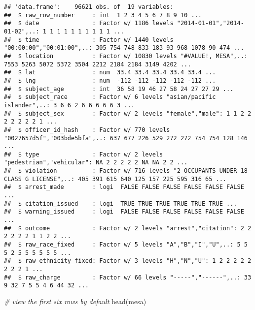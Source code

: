 \documentclass[
]{article}
\newenvironment{Shaded}{\begin{snugshade}}{\end{snugshade}}
\newcommand{\CommentTok}[1]{\textcolor[rgb]{0.56,0.35,0.01}{\textit{#1}}}
\newcommand{\FunctionTok}[1]{\textcolor[rgb]{0.00,0.00,0.00}{#1}}
\newcommand{\NormalTok}[1]{#1}
\begin{document}
\begin{verbatim}
## 'data.frame':    96621 obs. of  19 variables:
##  $ raw_row_number     : int  1 2 3 4 5 6 7 8 9 10 ...
##  $ date               : Factor w/ 1186 levels "2014-01-01","2014-01-02",..: 1 1 1 1 1 1 1 1 1 1 ...
##  $ time               : Factor w/ 1440 levels "00:00:00","00:01:00",..: 305 754 748 833 183 93 968 1078 90 474 ...
##  $ location           : Factor w/ 10830 levels "#VALUE!, MESA",..: 7553 5263 5072 5372 3504 2212 2184 2184 3149 4202 ...
##  $ lat                : num  33.4 33.4 33.4 33.4 33.4 ...
##  $ lng                : num  -112 -112 -112 -112 -112 ...
##  $ subject_age        : int  36 58 19 46 27 58 24 27 27 29 ...
##  $ subject_race       : Factor w/ 6 levels "asian/pacific islander",..: 3 6 6 2 6 6 6 6 6 3 ...
##  $ subject_sex        : Factor w/ 2 levels "female","male": 1 1 2 2 2 2 2 2 2 1 ...
##  $ officer_id_hash    : Factor w/ 770 levels "0027657d5f","003bde5bfa",..: 637 677 226 529 272 272 754 754 128 146 ...
##  $ type               : Factor w/ 2 levels "pedestrian","vehicular": NA 2 2 2 2 2 NA NA 2 2 ...
##  $ violation          : Factor w/ 716 levels "2 OCCUPANTS UNDER 18 CLASS G LICENSE",..: 405 391 615 640 125 157 225 595 316 65 ...
##  $ arrest_made        : logi  FALSE FALSE FALSE FALSE FALSE FALSE ...
##  $ citation_issued    : logi  TRUE TRUE TRUE TRUE TRUE TRUE ...
##  $ warning_issued     : logi  FALSE FALSE FALSE FALSE FALSE FALSE ...
##  $ outcome            : Factor w/ 2 levels "arrest","citation": 2 2 2 2 2 2 1 1 2 2 ...
##  $ raw_race_fixed     : Factor w/ 5 levels "A","B","I","U",..: 5 5 5 2 5 5 5 5 5 5 ...
##  $ raw_ethnicity_fixed: Factor w/ 3 levels "H","N","U": 1 2 2 2 2 2 2 2 2 1 ...
##  $ raw_charge         : Factor w/ 66 levels "-----","------",..: 33 9 32 7 5 5 4 6 44 32 ...
\end{verbatim}

\begin{Shaded}
\begin{Highlighting}[]
\CommentTok{\# view the first six rows by default}
\FunctionTok{head}\NormalTok{(mesa)}
\end{Highlighting}
\end{Shaded}
\end{document}

